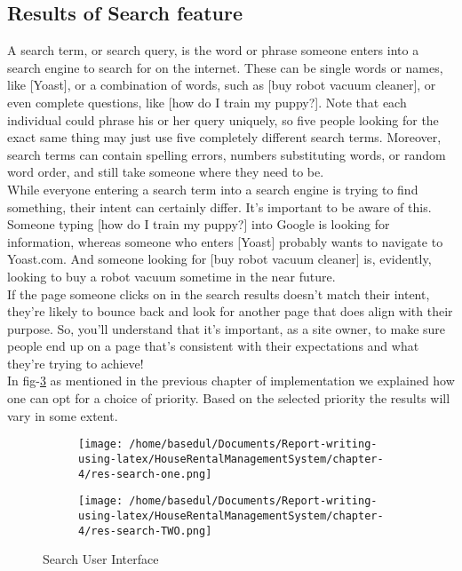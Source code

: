 \documentclass[12pt,a4paper]{report}
\newcommand\tab[1][0cm]{\hspace*{#1}}
\begin{document}
	\subsection{Results of Search feature}
	\tab A search term\cite{Ref:18}, or search query, is the word or phrase someone enters into a search engine to search for on the internet. These can be single words or names, like [Yoast], or a combination of words, such as [buy robot vacuum cleaner], or even complete questions, like [how do I train my puppy?]. Note that each individual could phrase his or her query uniquely, so five people looking for the exact same thing may just use five completely different search terms. Moreover, search terms can contain spelling errors, numbers substituting words, or random word order, and still take someone where they need to be.\\While everyone entering a search term into a search engine is trying to find something, their intent can certainly differ. It’s important to be aware of this. Someone typing [how do I train my puppy?] into Google is looking for information, whereas someone who enters [Yoast] probably wants to navigate to Yoast.com. And someone looking for [buy robot vacuum cleaner] is, evidently, looking to buy a robot vacuum sometime in the near future.\\If the page someone clicks on in the search results doesn’t match their intent, they’re likely to bounce back and look for another page that does align with their purpose. So, you’ll understand that it’s important, as a site owner, to make sure people end up on a page that’s consistent with their expectations and what they’re trying to achieve!\\In fig-\ref{fig:search} as mentioned in the previous chapter of implementation we explained how one can opt for a choice of
priority. Based on the selected priority the results will vary in some extent.
\begin{figure}[H]
 \centering
\begin{subfigure}{0.5\textwidth}
\texttt{[image: /home/basedul/Documents/Report-writing-using-latex/HouseRentalManagementSystem/chapter-4/res-search-one.png]} 
\label{fig:search1}
\end{subfigure}
\begin{subfigure}{0.5\textwidth}
\texttt{[image: /home/basedul/Documents/Report-writing-using-latex/HouseRentalManagementSystem/chapter-4/res-search-TWO.png]}
\label{fig:hyuuua}
\end{subfigure}
 
\caption{\hspace{0.35em}Search User Interface}
\label{fig:search}
\end{figure}
\end{document}
